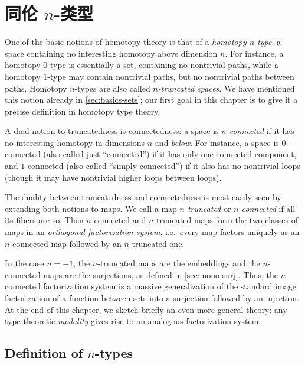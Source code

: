 \chapter{同伦 \texorpdfstring{$n$}{n}-类型}
\label{cha:hlevels}

%

One of the basic notions of homotopy theory is that of a \emph{homotopy $n$-type}: a space containing no interesting homotopy above dimension $n$.
For instance, a homotopy $0$-type is essentially a set, containing no nontrivial paths, while a homotopy $1$-type may contain nontrivial paths, but no nontrivial paths between paths.
Homotopy $n$-types are also called \emph{$n$-truncated spaces}.
We have mentioned this notion already in \cref{sec:basics-sets}; our first goal in this chapter is to give it a precise definition in homotopy type theory.

A dual notion to truncatedness is connectedness: a space is \emph{$n$-connected} if it has no interesting homotopy in dimensions $n$ and \emph{below}.
For instance, a space is $0$-connected (also called just ``connected'') if it has only one connected component, and $1$-connected (also called ``simply connected'') if it also has no nontrivial loops (though it may have nontrivial higher loops between loops).

The duality between truncatedness and connectedness is most easily seen by extending both notions to maps.
We call a map \emph{$n$-truncated} or \emph{$n$-connected} if all its fibers are so.
Then $n$-connected and $n$-truncated maps form the two classes of maps in an \emph{orthogonal factorization system},
i.e.\ every map factors uniquely as an $n$-connected map followed by an $n$-truncated one.

In the case $n={-1}$, the $n$-truncated maps are the embeddings and the $n$-connected maps are the surjections, as defined in \cref{sec:mono-surj}.
Thus, the $n$-connected factorization system is a massive generalization of the standard image factorization of a function between sets into a surjection followed by an injection.
At the end of this chapter, we sketch briefly an even more general theory: any type-theoretic \emph{modality} gives rise to an analogous factorization system.


\section{Definition of \texorpdfstring{$n$}{n}-types}
\label{sec:n-types}

